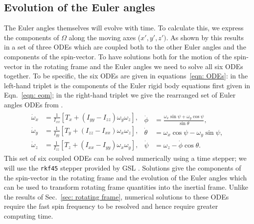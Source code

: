 \documentclass[../full_thesis/full_thesis.tex]{subfiles}
\begin{document}
\subsection{Evolution of the Euler angles}
The Euler angles themselves will evolve with time. To calculate this, we express
the components of $\Omega$ along the moving axes ($x', y', z')$. As shown by
\citet{Landau1969} this results in a set of three ODEs which are coupled both to
the other Euler angles and the components of the spin-vector. To have solutions
both for the motion of the spin-vector in the rotating frame and the Euler
angles we need to solve all six ODEs together. To be specific, the six ODEs are
given in equations~\eqref{eqn: ODEs}: in the left-hand triplet is the
components of the Euler rigid body equations first given in Eqn.~\eqref{eqn:
eom}; in the right-hand triplet we give the rearranged set of Euler angles ODEs
from \citet{Landau1969}.
\begin{align}
\begin{split}
\dot{\omega}_{x} & = \frac{1}{I_{xx}}\left[T_{x} +
                      \left(I_{yy} - I_{zz}\right) \omega_{y} \omega_{z}\right],
\\
\dot{\omega}_{y} & = \frac{1}{I_{yy}}\left[T_{y} +
                      \left(I_{zz} - I_{xx}\right) \omega_{x} \omega_{z}\right],
\\
\dot{\omega}_{z} & =\frac{1}{I_{zz}}\left[T_{z} +
                      \left(I_{xx} - I_{yy}\right) \omega_{x} \omega_{y}\right],
\end{split}
\begin{split}
\dot{\phi} & = \frac{\omega_{x} \sin \psi + \omega_{y} \cos \psi}{\sin \theta},\\
\dot{\theta} & = \omega_{x} \cos \psi - \omega_{y} \sin \psi,\\
\dot{\psi} & = \omega_{z} - \dot{\phi} \cos \theta.
\end{split}
\label{eqn: ODEs}
\end{align}
This set of six coupled ODEs can be solved numerically using a time stepper; we
will use the \texttt{rkf45} stepper provided by GSL \citep{gough2009gnu}.
Solutions give the components of the spin-vector in the rotating frame and the
evolution of the Euler angles which can be used to transform rotating frame
quantities into the inertial frame. Unlike the results of Sec.~\ref{sec:
rotating frame}, numerical solutions to these ODEs require the fast spin frequency
to be resolved and hence require greater computing time.

\end{document}
